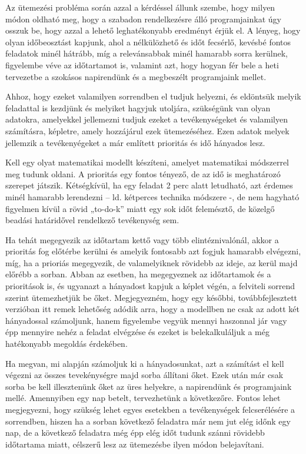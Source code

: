 

Az ütemezési probléma során azzal a kérdéssel állunk szembe, hogy milyen módon oldható meg, hogy a szabadon rendelkezésre álló programjainkat úgy osszuk be, hogy azzal a lehető leghatékonyabb eredményt érjük el. A lényeg, hogy olyan időbeosztást kapjunk, ahol a nélkülözhető és időt fecsérlő, kevésbé fontos feladatok minél hátrább, míg a relevánsabbak minél hamarabb sorra kerülnek, figyelembe véve az időtartamot is, valamint azt, hogy hogyan fér bele a heti tervezetbe a szokásos napirendünk és a megbeszélt programjaink mellet.

Ahhoz, hogy ezeket valamilyen sorrendben el tudjuk helyezni, és eldöntsük melyik feladattal is kezdjünk és melyiket hagyjuk utoljára, szükségünk van olyan adatokra, amelyekkel jellemezni tudjuk ezeket a tevékenységeket és valamilyen számításra, képletre, amely hozzájárul ezek ütemezéséhez. Ezen adatok melyek jellemzik a tevékenyégeket a már említett prioritás és idő hányados lesz. 

Kell egy olyat matematikai modellt készíteni, amelyet matematikai módszerrel meg tudunk oldani. A prioritás egy fontos tényező, de az idő is meghatározó szerepet játszik. Kétségkívül, ha egy feladat 2 perc alatt letudható, azt érdemes minél hamarabb lerendezni – ld. kétperces technika módszere -, de nem hagyható figyelmen kívül a rövid „to-do-k” miatt egy sok időt felemésztő, de közelgő beadási határidővel rendelkező tevékenység sem.

Ha tehát megegyezik az időtartam kettő vagy több elintéznivalónál, akkor a prioritás fog előtérbe kerülni és amelyik fontosabb azt fogjuk hamarabb elvégezni, míg, ha a prioriás megegyezik, de valamelyiknek rövidebb az ideje, az kerül majd előrébb a sorban. Abban az esetben, ha megegyeznek az időtartamok és a prioritások is, és ugyanazt a hányadost kapjuk a képlet végén, a felviteli sorrend szerint ütemezhetjük be őket. Megjegyezném, hogy egy későbbi, továbbfejlesztett verzióban itt remek lehetőség adódik arra, hogy a modellben ne csak az adott két hányadossal számoljunk, hanem figyelembe vegyük mennyi haszonnal jár vagy épp mennyire nehéz a feladat elvégzése és ezeket is belekalkuláljuk a még hatékonyabb megoldás érdekében.


Ha megvan, mi alapján számoljuk ki a hányadosunkat, azt a számítást el kell végezni az összes tevekénységre majd sorba állítani őket. Ezek után már csak sorba be kell illesztenünk őket az üres helyekre, a napirendünk és programjaink mellé. Amennyiben egy nap betelt, tervezhetünk a következőre. Fontos lehet megjegyezni, hogy szükség lehet egyes esetekben a tevékenységek felcserélésére a sorrendben, hiszen ha a sorban következő feladatra már nem jut elég időnk egy nap, de a következő feladatra még épp elég időt tudunk szánni rövidebb időtartama miatt, célszerű lesz az ütemezésbe ilyen módon belejavítani.

